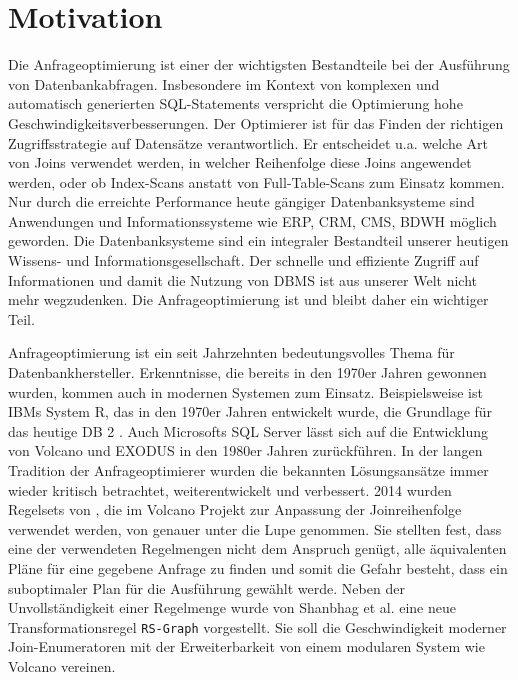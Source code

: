 \section{Motivation}


Die Anfrageoptimierung ist einer der wichtigsten Bestandteile bei der Ausführung von Datenbankabfragen. Insbesondere im Kontext von komplexen und automatisch generierten SQL-Statements verspricht die Optimierung hohe Geschwindigkeitsverbesserungen. Der Optimierer ist für das Finden der richtigen Zugriffsstrategie auf Datensätze verantwortlich. Er entscheidet u.a. welche Art von Joins verwendet werden, in welcher Reihenfolge diese Joins angewendet werden, oder ob Index-Scans anstatt von Full-Table-Scans zum Einsatz kommen. Nur durch die erreichte Performance heute gängiger Datenbanksysteme sind Anwendungen und Informationssysteme wie \ac{ERP}, \ac{CRM}, \ac{CMS}, \ac{BDWH} möglich geworden. Die Datenbanksysteme sind ein integraler Bestandteil unserer heutigen Wissens- und Informationsgesellschaft. Der schnelle und effiziente Zugriff auf Informationen und damit die Nutzung von \ac{DBMS} ist aus unserer Welt nicht mehr wegzudenken. Die Anfrageoptimierung ist und bleibt daher ein wichtiger Teil.

Anfrageoptimierung ist ein seit Jahrzehnten bedeutungsvolles Thema für Datenbankhersteller. Erkenntnisse, die bereits in den 1970er Jahren gewonnen wurden, kommen auch in modernen Systemen zum Einsatz. Beispielsweise ist IBMs System R, das in den 1970er Jahren entwickelt wurde, die Grundlage für das heutige DB 2  \cite{wade2012ibm}. Auch Microsofts SQL Server lässt sich auf die Entwicklung von Volcano und EXODUS in den 1980er Jahren zurückführen.
In der langen Tradition der Anfrageoptimierer wurden die bekannten Lösungsansätze immer wieder kritisch betrachtet, weiterentwickelt und verbessert. 2014 wurden Regelsets von \cite{pellenkoft1997complexity}, die im Volcano Projekt zur Anpassung der Joinreihenfolge verwendet werden, von \cite{shanbhag2014optimizing} genauer unter die Lupe genommen.
Sie stellten fest, dass eine der verwendeten Regelmengen nicht dem Anspruch genügt, alle äquivalenten Pläne für eine gegebene Anfrage zu finden und somit die Gefahr besteht, dass ein suboptimaler Plan für die Ausführung gewählt werde. Neben der Unvollständigkeit einer Regelmenge wurde von Shanbhag et al. eine neue Transformationsregel \texttt{RS-Graph} vorgestellt. Sie soll die Geschwindigkeit moderner Join-Enumeratoren mit der Erweiterbarkeit von einem modularen System wie Volcano vereinen.

